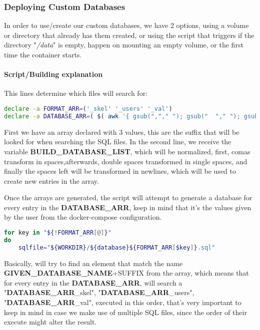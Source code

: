 \subsubsection[Deploying Custom Databases]{Deploying Custom Databases}
\begin{flushleft}
    In order to use/create our custom databases, we have 2 options, using a volume or directory that already has them
    created, or using the script that triggers if the directory "\textit{/data}" is empty, happen on mounting an empty
    volume, or the first time the container starts.
\end{flushleft}
\paragraph{Script/Building explanation}
\begin{flushleft}
    This lines determine which files will search for:
    \begin{lstlisting}[language=bash,label={lst:declare_array}]
declare -a FORMAT_ARR=('_skel' '_users' '_val')
declare -a DATABASE_ARR=( $( awk '{ gsub(","," "); gsub("  "," "); gsub(" ","\n"); print}' <<< "$BUILD_DATABASE_LIST" ) );
    \end{lstlisting}
    First we have an array declared with 3 values, this are the suffix that will be looked for when searching the SQL files.
    In the second line, we receive the variable \textbf{BUILD\_DATABASE\_LIST}, which will be normalized, first, comas transform
    in spaces,afterwards, double spaces transformed in single spaces, and finally the spaces left will be transformed in newlines,
    which will be used to create new entries in the array.

    \begin{flushleft}
        Once the arrays are generated, the script will attempt to generate a database for every entry in the
        \textbf{DATABASE\_ARR}, keep in mind that it's the values given by the user from the docker-compose configuration.
    \end{flushleft}

    \begin{lstlisting}[language=bash,label={lst:for_array}]
for key in "${!FORMAT_ARR[@]}"
do
    sqlfile="${WORKDIR}/${database}${FORMAT_ARR[$key]}.sql"
    \end{lstlisting}
    Basically, will try to find an element that match the name \textbf{GIVEN\_DATABASE\_NAME}+SUFFIX from the array,
    which means that for every entry in the \textbf{DATABASE\_ARR}, will search a "\textbf{DATABASE\_ARR}\_skel",
    "\textbf{DATABASE\_ARR}\_users", "\textbf{DATABASE\_ARR}\_val", executed in this order, that's very important to
    keep in mind in case we make use of multiple SQL files, since the order of their execute might alter the result.
\end{flushleft}

